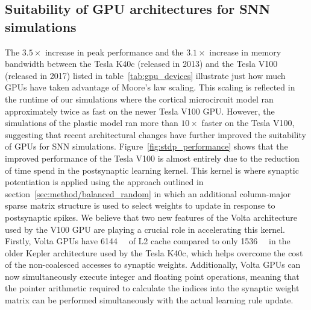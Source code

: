 \documentclass[utf8]{frontiersSCNS} %
\begin{document}
\subsection{Suitability of GPU architectures for SNN simulations}
The $3.5\times$ increase in peak performance and the $3.1\times$ increase in memory bandwidth between the Tesla K40c (released in 2013) and the Tesla V100 (released in 2017) listed in table~\ref{tab:gpu_devices} illustrate just how much GPUs have taken advantage of Moore's law scaling.
This scaling is reflected in the runtime of our simulations where the cortical microcircuit model ran approximately twice as fast on the newer Tesla V100 GPU.
However, the simulations of the plastic model ran more than $10\times$ faster on the Tesla V100, suggesting that recent architectural changes have further improved the suitability of GPUs for SNN simulations.
Figure~\ref{fig:stdp_performance} shows that the improved performance of the Tesla V100 is almost entirely due to the reduction of time spend in the postsynaptic learning kernel.
This kernel is where synaptic potentiation is applied using the approach outlined in section~\ref{sec:method/balanced_random} in which an additional column-major sparse matrix structure is used to select weights to update in response to postsynaptic spikes.
We believe that two new features of the Volta architecture~\citep{Nvidia2017} used by the V100 GPU are playing a crucial role in accelerating this kernel.
Firstly, Volta GPUs have \SI{6144}{\kibi\byte} of L2 cache compared to only \SI{1536}{\kibi\byte} in the older Kepler architecture used by the Tesla K40c, which helps overcome the cost of the non-coalesced accesses to synaptic weights.
Additionally, Volta GPUs can now simultaneously execute integer and floating point operations, meaning that the pointer arithmetic required to calculate the indices into the synaptic weight matrix can be performed simultaneously with the actual learning rule update.
\end{document}
